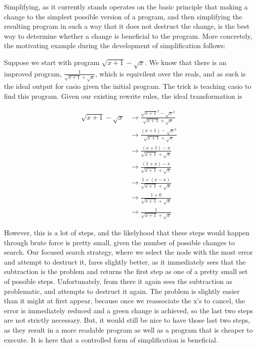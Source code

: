 \documentclass{article}
\newcommand{\sqrsqrt}[1]{\sqrt{#1}^2}
\begin{document}
Simplifying, 
as it currently stands 
operates on the basic principle 
that making a change to the 
simplest possible version of a program, 
and then simplifying the resulting program 
in such a way that 
it does not destruct the change, 
is the best way to determine 
whether a change is beneficial 
to the program. 
More concretely, 
the motivating example during 
the development of simplification follows:

Suppose we start with program $\sqrt{x+1} - \sqrt{x}$. 
We know that there is an improved program, 
$\frac{1}{\sqrt{x+1} + \sqrt{x}}$, 
which is equivilent over the reals, 
and as such is the ideal output 
for casio given the initial program. 
The trick is teaching casio 
to find this program. 
Given our existing rewrite rules, 
the ideal transformation is 

\begin{align*}
\sqrt{x + 1} - \sqrt{x} &\to \frac{\sqrsqrt{x + 1} - \sqrsqrt{x}}{\sqrt{x + 1} + \sqrt{x}}\\
&\to \frac{(x + 1) - \sqrsqrt{x}}{\sqrt{x + 1} + \sqrt{x}}\\
&\to \frac{(x + 1) - x}{\sqrt{x + 1} + \sqrt{x}}\\
&\to \frac{(1 + x) - x}{\sqrt{x + 1} + \sqrt{x}}\\
&\to \frac{1 + (x - x)}{\sqrt{x + 1} + \sqrt{x}}\\
&\to \frac{1 + 0}{\sqrt{x + 1} + \sqrt{x}}\\
&\to \frac{1}{\sqrt{x + 1} + \sqrt{x}}
\end{align*}

However, this is a lot of steps, 
and the likelyhood that these steps 
would happen through brute force 
is pretty small, 
given the number of possible 
changes to search. 
Our focused search strategy, 
where we select the node 
with the most error 
and attempt to destruct it, 
fares slightly better, 
as it immediately sees that the subtraction is the problem 
and returns the first step as one 
of a pretty small set of possible steps. 
Unfortunately, 
from there it again sees the subtraction as problematic, 
and attempts to destruct it again. 
The problem is slightly easier than it might at first appear, 
because once we reassociate the x's to cancel, 
the error is immediately reduced 
and a green change is achieved, 
so the last two steps are not strictly necessary. 
But, it would still be nice to have those last two steps, 
as they result in a more readable program 
as well as a program that is cheaper to execute. 
It is here that a controlled form 
of simplification is beneficial.
\end{document}
